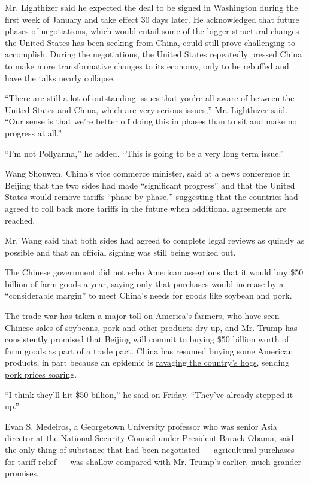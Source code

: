 Mr. Lighthizer said he expected the deal to be signed in Washington
during the first week of January and take effect 30 days later. He
acknowledged that future phases of negotiations, which would entail some
of the bigger structural changes the United States has been seeking from
China, could still prove challenging to accomplish. During the
negotiations, the United States repeatedly pressed China to make more
transformative changes to its economy, only to be rebuffed and have the
talks nearly collapse.

``There are still a lot of outstanding issues that you're all aware of
between the United States and China, which are very serious issues,''
Mr. Lighthizer said. ``Our sense is that we're better off doing this in
phases than to sit and make no progress at all.''

``I'm not Pollyanna,'' he added. ``This is going to be a very long term
issue.''

Wang Shouwen, China's vice commerce minister, said at a news conference
in Beijing that the two sides had made ``significant progress'' and that
the United States would remove tariffs ``phase by phase,'' suggesting
that the countries had agreed to roll back more tariffs in the future
when additional agreements are reached.

Mr. Wang said that both sides had agreed to complete legal reviews as
quickly as possible and that an official signing was still being worked
out.

The Chinese government did not echo American assertions that it would
buy \$50 billion of farm goods a year, saying only that purchases would
increase by a ``considerable margin'' to meet China's needs for goods
like soybean and pork.

The trade war has taken a major toll on America's farmers, who have seen
Chinese sales of soybeans, pork and other products dry up, and Mr. Trump
has consistently promised that Beijing will commit to buying \$50
billion worth of farm goods as part of a trade pact. China has resumed
buying some American products, in part because an epidemic is
\href{https://www.nytimes.com/2019/04/22/business/china-pigs-african-swine-fever.html}{ravaging
the country's hogs}, sending
\href{https://www.nytimes.com/2019/10/07/business/china-strategic-pork-reserve.html}{pork
prices soaring}.

``I think they'll hit \$50 billion,'' he said on Friday. ``They've
already stepped it up.''

Evan S. Medeiros, a Georgetown University professor who was senior Asia
director at the National Security Council under President Barack Obama,
said the only thing of substance that had been negotiated ---
agricultural purchases for tariff relief --- was shallow compared with
Mr. Trump's earlier, much grander promises.

